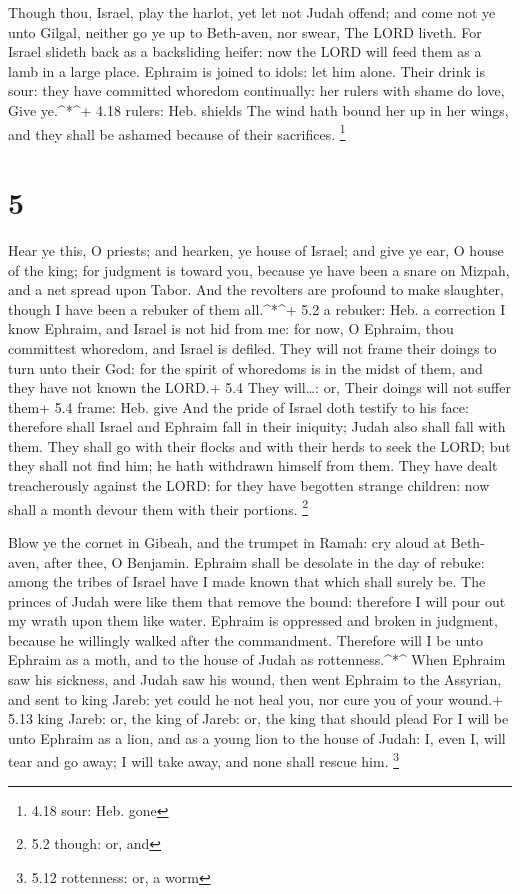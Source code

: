  Though thou, Israel, play the harlot, yet let not Judah
offend; and come not ye unto Gilgal, neither go ye up to Beth-aven, nor
swear, The LORD liveth.  For Israel slideth back as a
backsliding heifer: now the LORD will feed them as a lamb in a large
place.  Ephraim is joined to idols: let him alone.
 Their drink is sour: they have committed whoredom
continually: her rulers with shame do love, Give ye.\^{}*\^{}+ 4.18
rulers: Heb. shields  The wind hath bound her up in her
wings, and they shall be ashamed because of their sacrifices.
\footnote{4.18 sour: Heb. gone}

\hypertarget{section-4}{%
\section{5}\label{section-4}}

 Hear ye this, O priests; and hearken, ye house of Israel;
and give ye ear, O house of the king; for judgment is toward you,
because ye have been a snare on Mizpah, and a net spread upon Tabor.
 And the revolters are profound to make slaughter, though I
have been a rebuker of them all.\^{}*\^{}+ 5.2 a rebuker: Heb. a
correction  I know Ephraim, and Israel is not hid from me:
for now, O Ephraim, thou committest whoredom, and Israel is defiled.
 They will not frame their doings to turn unto their God:
for the spirit of whoredoms is in the midst of them, and they have not
known the LORD.+ 5.4 They will\ldots: or, Their doings will not suffer
them+ 5.4 frame: Heb. give  And the pride of Israel doth
testify to his face: therefore shall Israel and Ephraim fall in their
iniquity; Judah also shall fall with them.  They shall go
with their flocks and with their herds to seek the LORD; but they shall
not find him; he hath withdrawn himself from them.  They
have dealt treacherously against the LORD: for they have begotten
strange children: now shall a month devour them with their portions.
\footnote{5.2 though: or, and}

 Blow ye the cornet in Gibeah, and the trumpet in Ramah: cry
aloud at Beth-aven, after thee, O Benjamin.  Ephraim shall
be desolate in the day of rebuke: among the tribes of Israel have I made
known that which shall surely be.  The princes of Judah
were like them that remove the bound: therefore I will pour out my wrath
upon them like water.  Ephraim is oppressed and broken in
judgment, because he willingly walked after the commandment.
 Therefore will I be unto Ephraim as a moth, and to the
house of Judah as rottenness.\^{}*\^{}  When Ephraim saw
his sickness, and Judah saw his wound, then went Ephraim to the
Assyrian, and sent to king Jareb: yet could he not heal you, nor cure
you of your wound.+ 5.13 king Jareb: or, the king of Jareb: or, the king
that should plead  For I will be unto Ephraim as a lion,
and as a young lion to the house of Judah: I, even I, will tear and go
away; I will take away, and none shall rescue him. \footnote{5.12
  rottenness: or, a worm}


